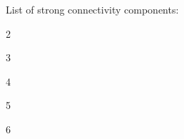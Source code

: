 \documentclass{article}
\begin{document}
List of strong connectivity components:


2

3

4

5

6
\end{document}
